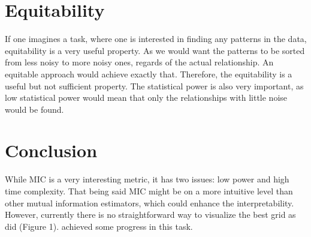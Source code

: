 \documentclass{article}
\begin{document}
\section{Equitability}

If one imagines a task, where one is interested in finding any patterns in the data, equitability is a very useful property. As we would want the patterns to be sorted from less noisy to more noisy ones, regards of the actual relationship. An equitable approach would achieve exactly that. Therefore, the equitability is a useful but not sufficient property. The statistical power is also very important, as low statistical power would mean that only the relationships with little noise would be found.


\section{Conclusion}
While MIC is a very interesting metric, it has two issues: low power and high time complexity. That being said MIC might be on a more intuitive level than other mutual information estimators, which could enhance the interpretability. However, currently there is no straightforward way to visualize the best grid as \cite{reshef2011} did (Figure 1). \cite{cao2021} achieved some progress in this task. 



	

\end{document}

